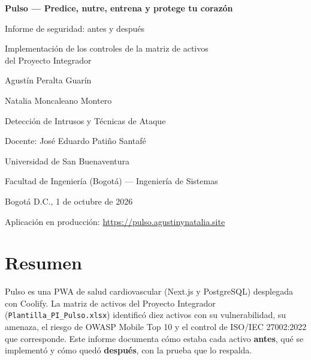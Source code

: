 \documentclass[11pt,letterpaper]{article}
\newcommand{\cod}[1]{\texttt{#1}}
\begin{document}
\begin{titlepage}
\centering
\vspace*{1.2cm}
{\LARGE\bfseries Pulso — Predice, nutre, entrena y protege tu corazón\par}
\vspace{1.0cm}
{\Large Informe de seguridad: antes y después\par}
\vspace{0.4cm}
{\large Implementación de los controles de la matriz de activos\\ del Proyecto Integrador\par}

\vspace{2.0cm}
{\large Agustín Peralta Guarín\par}
\vspace{0.3cm}
{\large Natalia Moncaleano Montero\par}

\vspace{1.6cm}
{\large Detección de Intrusos y Técnicas de Ataque\par}
\vspace{0.3cm}
{\large Docente: José Eduardo Patiño Santafé\par}

\vspace{1.6cm}
{\large Universidad de San Buenaventura\par}
\vspace{0.3cm}
{\large Facultad de Ingeniería (Bogotá) — Ingeniería de Sistemas\par}
\vspace{0.3cm}
{\large Bogotá D.C., 1 de octubre de 2026\par}
\vfill
{\small\color{gris} Aplicación en producción: \url{https://pulso.agustinynatalia.site}\par}
\end{titlepage}

\setcounter{page}{1}

\section{Resumen}

Pulso es una PWA de salud cardiovascular (Next.js y PostgreSQL) desplegada con
Coolify. La matriz de activos del Proyecto Integrador
(\cod{Plantilla\_PI\_Pulso.xlsx}) identificó diez activos con su vulnerabilidad,
su amenaza, el riesgo de OWASP Mobile Top 10 y el control de ISO/IEC
27002:2022 que corresponde. Este informe documenta cómo estaba cada activo
\textbf{antes}, qué se implementó y cómo quedó \textbf{después}, con la prueba que
lo respalda.
\end{document}

